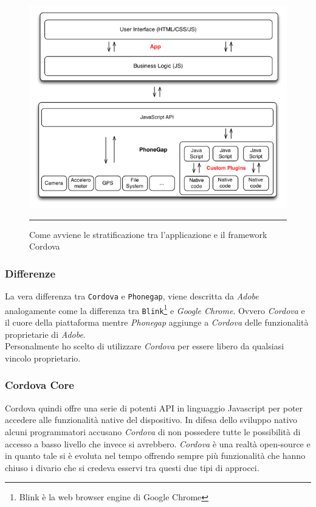 \begin{figure}[!ht]
  \centering
    \includegraphics[scale=0.65]{Figures/cordova_schema.png} 
    \rule{35em}{0.5pt}
  \caption[Struttura a Livelli di Cordova]{Come avviene le stratificazione tra l'applicazione e il framework Cordova}
  \label{fig:cordova-layers}
\end{figure}

\subsubsection{Differenze}
La vera differenza tra \texttt{Cordova} e \texttt{Phonegap}, viene descritta da \emph{Adobe} analogamente come la differenza tra \texttt{Blink}\footnote{Blink è la web browser engine di Google Chrome\cite{wiki:blink}} e \emph{Google Chrome}. Ovvero \emph{Cordova} e il cuore della piattaforma mentre \emph{Phonegap} aggiunge a \emph{Cordova} delle funzionalità proprietarie di \emph{Adobe}.\\
Personalmente ho scelto di utilizzare \emph{Cordova} per essere libero da qualsiasi vincolo proprietario.

\subsubsection{Cordova Core}
Cordova quindi offre una serie di potenti API in linguaggio Javascript per poter accedere alle funzionalità native del dispositivo. In difesa dello sviluppo nativo alcuni programmatori accusano \emph{Cordova} di non possedere tutte le possibilità di accesso a basso livello che invece si avrebbero. \emph{Cordova} è una realtà open-source e in quanto tale si è evoluta nel tempo offrendo sempre più funzionalità che hanno chiuso i divario che si credeva esservi tra questi due tipi di approcci.

